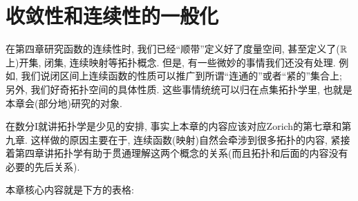 \chapter{收敛性和连续性的一般化}

在第四章研究函数的连续性时, 我们已经“顺带”定义好了度量空间, 甚至定义了($\mathbb{R}$上)开集, 闭集, 连续映射等拓扑概念. 但是, 有一些微妙的事情我们还没有处理. 例如, 我们说闭区间上连续函数的性质可以推广到所谓“连通的”或者“紧的”集合上; 另外, 我们好奇拓扑空间的具体性质. 这些事情统统可以归在点集拓扑学里, 也就是本章会(部分地)研究的对象. 

在数分I就讲拓扑学是少见的安排, 事实上本章的内容应该对应Zorich的第七章和第九章. 这样做的原因主要在于, 连续函数(映射)自然会牵涉到很多拓扑的内容, 紧接着第四章讲拓扑学有助于贯通理解这两个概念的关系(而且拓扑和后面的内容没有必要的先后关系). 

本章核心内容就是下方的表格: 

